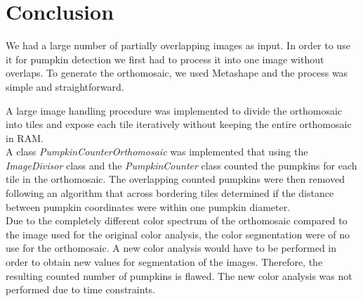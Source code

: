 \documentclass[../Head/Main.tex]{subfiles}
\begin{document}
\section{Conclusion}
We had a large number of partially overlapping images as input.
In order to use it for pumpkin detection we first had to process it into one image without overlaps.
To generate the orthomosaic, we used Metashape and the process was simple and straightforward.

A large image handling procedure was implemented to divide the orthomosaic into tiles and expose each tile iteratively without keeping the entire orthomosaic in RAM.\\
A class \textit{PumpkinCounterOrthomosaic} was implemented that using the \textit{ImageDivisor} class and the \textit{PumpkinCounter} class counted the pumpkins for each tile in the orthomosaic. The overlapping counted pumpkins were then removed following an algorithm that across bordering tiles determined if the distance between pumpkin coordinates were within one pumpkin diameter.\\
Due to the completely different color spectrum of the orthomosaic compared to the image used for the original color analysis, the color segmentation were of no use for the orthomosaic. A new color analysis would have to be performed in order to obtain new values for segmentation of the images. Therefore, the resulting counted number of pumpkins is flawed. The new color analysis was not performed due to time constraints.
\end{document}
